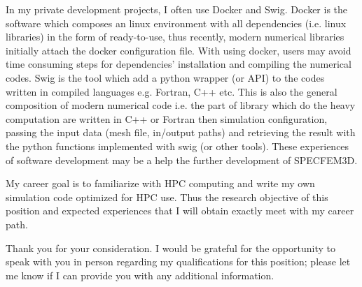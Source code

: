 \documentclass[9pt,a4paper]{moderncv}
\begin{document}
    In my private development projects, I often use Docker and Swig. Docker is the software which composes an linux environment with all dependencies (i.e. linux libraries) in the form of ready-to-use, thus recently, modern numerical libraries initially attach the docker configuration file. With using docker, users may avoid time consuming steps for dependencies' installation and compiling the numerical codes. 
    Swig is the tool which add a python wrapper (or API) to the codes written in compiled languages e.g. Fortran, C++ etc. This is also the general composition of modern numerical code i.e. the part of library which do the heavy computation are written in C++ or Fortran then simulation configuration, passing the input data (mesh file, in/output paths) and retrieving the result with the python functions implemented with swig (or other tools). 
    These experiences of software development may be a help the further development of SPECFEM3D.
    
    My career goal is to familiarize with HPC computing and write my own simulation code optimized for HPC use.
    Thus the research objective of this position and expected experiences that I will obtain exactly meet with my career path.
    
    Thank you for your consideration. I would be grateful for the opportunity to speak with you in person regarding my qualifications for this position; please let me know if I can provide you with any additional information.
  
    \makeletterclosing

    
\end{document}
